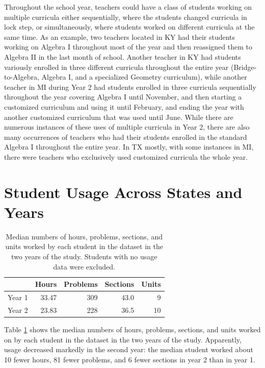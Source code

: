 \documentclass[12pt]{article}\usepackage[]{graphicx}\usepackage[]{color}
\begin{document}
Throughout the school year, teachers could have a class of students
working on multiple curricula either sequentially, where the students
changed curricula in lock step, or simultaneously, where students
worked on different curricula at the same time. As an example, two
teachers located in KY had their students working on Algebra I
throughout most of the year and then reassigned them to Algebra II in
the last month of school. Another teacher in KY had students variously
enrolled in three different curricula throughout the entire year
(Bridge-to-Algebra, Algebra I, and a specialized Geometry curriculum),
while another teacher in MI during Year 2 had students enrolled in
three curricula sequentially throughout the year covering Algebra I
until November, and then starting a customized curriculum and using it
until February, and ending the year with another customized curriculum
that was used until June. While there are numerous instances of these
uses of multiple curricula in Year 2, there are also many occurrences
of teachers who had their students enrolled in the standard Algebra I
throughout the entire year.  In TX mostly, with some instances in MI,
there were teachers who exclusively used customized curricula the
whole year.

\section{Student Usage Across States and Years}\label{sec:usage}

\begin{table}[ht]
\centering
\begin{tabular}{rrrrr}
  \hline
 & Hours & Problems & Sections & Units \\ 
  \hline
Year 1 & 33.47 & 309 & 43.0 & 9 \\ 
  Year 2 & 23.83 & 228 & 36.5 & 10 \\ 
   \hline
\end{tabular}
\caption{Median numbers of hours, problems, sections, and units worked by each student in the dataset in the two years of the study. Students with no usage data were excluded.} 
\label{tab:medUsage}
\end{table}



Table \ref{tab:medUsage} shows the median numbers of hours,
problems, sections, and units worked on by each student in the dataset
in the two years of the study.
Apparently, usage decreased markedly in the second year: the median
student worked about
10
fewer hours,
81
fewer problems, and
6 fewer
sections in year 2 than in year 1.
\end{document}
